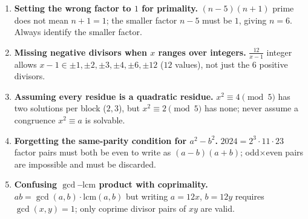 \documentclass[11pt,a4paper]{article}
\begin{document}
\begin{enumerate}[leftmargin=2em, itemsep=4pt]
  \item \textbf{Setting the wrong factor to $1$ for primality.}
        $(n-5)(n+1)$ prime does not mean $n+1=1$; the smaller factor $n-5$ must be $1$, giving $n=6$. Always identify the smaller factor. 
  \item \textbf{Missing negative divisors when $x$ ranges over integers.}
        $\frac{12}{x-1}$ integer allows $x-1\in\pm1,\pm2,\pm3,\pm4,\pm6,\pm12$ ($12$ values), not just the $6$ positive divisors. 
  \item \textbf{Assuming every residue is a quadratic residue.}
        $x^{2}\equiv4\pmod5$ has two solutions per block ($2,3$), but $x^{2}\equiv2\pmod5$ has none; never assume a congruence $x^{2}\equiv a$ is solvable. 
  \item \textbf{Forgetting the same-parity condition for $a^{2}-b^{2}$.}
        $2024=2^{3}\cdot11\cdot23$ factor pairs must both be even to write as $(a-b)(a+b)$; odd$\times$even pairs are impossible and must be discarded. 
  \item \textbf{Confusing $\gcd$--$\mathrm{lcm}$ product with coprimality.}
        $ab=\gcd(a,b)\cdot\mathrm{lcm}(a,b)$ but writing $a=12x$, $b=12y$ requires $\gcd(x,y)=1$; only coprime divisor pairs of $xy$ are valid. 
\end{enumerate}

\end{document}
